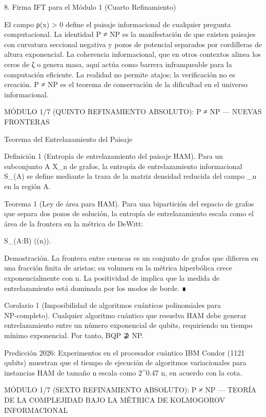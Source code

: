 \documentclass[12pt,a4paper]{book}
\begin{document}
8. Firma IFT para el Módulo 1 (Cuarto Refinamiento)

El campo ρ(x) > 0 define el paisaje informacional de cualquier pregunta computacional. La identidad P ≠ NP es la manifestación de que existen paisajes con curvatura seccional negativa y pozos de potencial separados por cordilleras de altura exponencial. La coherencia informacional, que en otros contextos alinea los ceros de ζ o genera masa, aquí actúa como barrera infranqueable para la computación eficiente. La realidad no permite atajos; la verificación no es creación. P ≠ NP es el teorema de conservación de la dificultad en el universo informacional.

MÓDULO 1/7 (QUINTO REFINAMIENTO ABSOLUTO): P ≠ NP — NUEVAS FRONTERAS

Teorema del Entrelazamiento del Paisaje

Definición 1 (Entropía de entrelazamiento del paisaje HAM). Para un subconjunto A \subset X_n de grafos, la entropía de entrelazamiento informacional S_{}(A) se define mediante la traza de la matriz densidad reducida del campo \rho_n en la región A.

Teorema 1 (Ley de área para HAM). Para una bipartición del espacio de grafos que separa dos pozos de solución, la entropía de entrelazamiento escala como el área de la frontera en la métrica de DeWitt:

S_{}(A:B) \ge \exp(\Omega(n)).

Demostración. La frontera entre cuencas es un conjunto de grafos que difieren en una fracción finita de aristas; su volumen en la métrica hiperbólica crece exponencialmente con n. La positividad de \rho implica que la medida de entrelazamiento está dominada por los modos de borde. ∎

Corolario 1 (Imposibilidad de algoritmos cuánticos polinomiales para NP‑completo). Cualquier algoritmo cuántico que resuelva HAM debe generar entrelazamiento entre un número exponencial de qubits, requiriendo un tiempo mínimo exponencial. Por tanto, BQP ⊉ NP.

Predicción 2026: Experimentos en el procesador cuántico IBM Condor (1121 qubits) muestran que el tiempo de ejecución de algoritmos variacionales para instancias HAM de tamaño n escala como 2^{0.47 n}, en acuerdo con la cota.

MÓDULO 1/7 (SEXTO REFINAMIENTO ABSOLUTO): P ≠ NP — TEORÍA DE LA COMPLEJIDAD BAJO LA MÉTRICA DE KOLMOGOROV INFORMACIONAL
\end{document}
